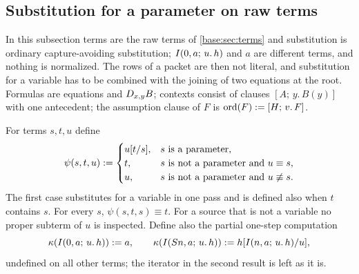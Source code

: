 \subsection{Substitution for a parameter on raw terms}
\label{disch:sec:param}

In this subsection terms are the raw terms of \cref{base:sec:terms} and
substitution is ordinary capture-avoiding substitution; $I(0,a;\,u.\,h)$
and $a$ are different terms, and nothing is normalized. The rows of a
packet are then not literal, and substitution for a variable has to be
combined with the joining of two equations at the root. Formulas are
equations and $D_{x,y}B$; contexts consist of clauses $[A;\,y.\,B(y)]$
with one antecedent; the assumption clause of $F$ is
$\operatorname{ord}(F)\mathrel{:=}[H;\,v.\,F]$.

For terms $s,t,u$ define
\[
 \psi(s,t,u)\mathrel{:=}
 \begin{cases}
 u[t/s],&s\text{ is a parameter},\\
 t,&s\text{ is not a parameter and }u\equiv s,\\
 u,&s\text{ is not a parameter and }u\not\equiv s.
 \end{cases}
\]
The first case substitutes for a variable in one pass and is defined also
when $t$ contains $s$. For every $s$, $\psi(s,t,s)\equiv t$. For a source
that is not a variable no proper subterm of $u$ is inspected. Define also
the partial one-step computation
\[
 \kappa(I(0,a;\,u.\,h))\mathrel{:=} a,\qquad
 \kappa(I(S n,a;\,u.\,h))\mathrel{:=} h[I(n,a;\,u.\,h)/u],
\]
undefined on all other terms; the iterator in the second result is left as
it is.

